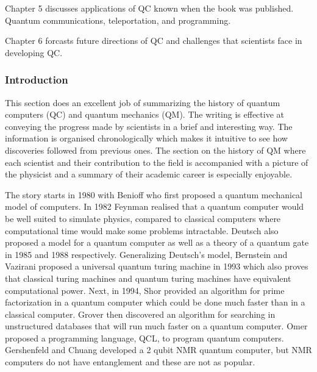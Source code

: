 \documentclass[conf]{new-aiaa}
\begin{document}
Chapter 5 discusses applications of QC known when the book was published. Quantum communications, teleportation, and programming.

Chapter 6 forcasts future directions of QC and challenges that scientists face in developing QC.


\subsubsection{Introduction}

This section does an excellent job of summarizing the history of quantum computers (QC) and quantum mechanics (QM). The writing is effective at conveying the progress made by scientists in a brief and interesting way. The information is organised chronologically which makes it intuitive to see how discoveries followed from previous ones. The section on the history of QM where each scientist and their contribution to the field is accompanied with a picture of the physicist and a summary of their academic career is especially enjoyable.

The story starts in 1980 with Benioff who first proposed a quantum mechanical model of computers. \cite{benioff1980computer} In 1982 Feynman realised that a quantum computer would be well suited to simulate physics, compared to classical computers where computational time would make some problems intractable. \cite{feynman1982simulating} Deutsch also proposed a model for a quantum computer as well as a theory of a quantum gate in 1985 and 1988 respectively. \cite{deutsch1985quantum, deutsch1995universality} Generalizing Deutsch's model, Bernstein and Vazirani proposed a universal quantum turing machine in 1993 which also proves that classical turing machines and quantum turing machines have equivalent computational power. \cite{bernstein1997quantum} Next, in 1994, Shor provided an algorithm for prime factorization in a quantum computer which could be done much faster than in a classical computer. \cite{shor1999polynomial} Grover then discovered an algorithm for searching in unstructured databases that will run much faster on a quantum computer. \cite{grover1996fast} Omer proposed a programming language, QCL, to program quantum computers. Gershenfeld and Chuang developed a 2 qubit NMR quantum computer, but NMR computers do not have entanglement and these are not as popular.
\end{document}
